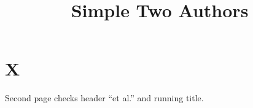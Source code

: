 \documentclass[titlepage=simple]{SUSTechHomework}
\title{Simple Two Authors}
\begin{document}
\clearauthors
{}
\maketitle
\section{X}
Second page checks header ``et al.'' and running title.
\end{document}
